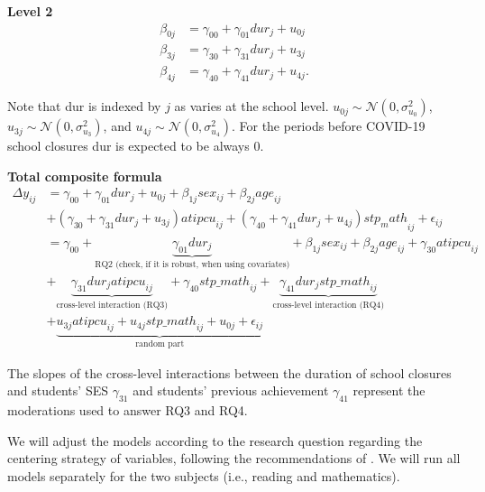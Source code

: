 \noindent\textbf{Level 2}
\begin{equation}\tag{3.2}
    \begin{aligned}
    \beta_{0j} &= \gamma_{00} + \gamma_{01} {dur}_j + u_{0j}\\
    \beta_{3j} &= \gamma_{30} + \gamma_{31} {dur}_j + u_{3j}\\
    \beta_{4j} &= \gamma_{40} + \gamma_{41} {dur}_j + u_{4j}.
    \end{aligned}
\end{equation}

Note that dur is indexed by $j$ as  varies at the school level. $u_{0j} \sim \mathcal{N}(0, \sigma_{u_0}^2)$, $u_{3j} \sim \mathcal{N}(0, \sigma_{u_3}^2)$, and $u_{4j} \sim \mathcal{N}(0, \sigma_{u_4}^2)$. For the periods before COVID-19 school closures dur is expected to be always 0.

\noindent\textbf{Total composite formula}
\begin{equation}\tag{3.3}
	\begin{aligned}
		\Delta y_{ij} &= \gamma_{00} + \gamma_{01} {dur}_j + u_{0j} + \beta_{1j} {sex}_{ij} + \beta_{2j} {age}_{ij}\\
            &+ (\gamma_{30} + \gamma_{31} {dur}_j + u_{3j}) {atipcu}_{ij} + (\gamma_{40} + \gamma_{41} {dur}_j + u_{4j}) {stp_math}_{ij} + \epsilon_{ij}\\
			&= \gamma_{00} + \underbrace{\gamma_{01} {dur}_j}_{\text{RQ2 (check, if it is robust, when using covariates)}} + \beta_{1j} {sex}_{ij} + \beta_{2j} {age}_{ij} + \gamma_{30} {atipcu}_{ij}\\
            &+ \underbrace{\gamma_{31} {dur}_j {atipcu}_{ij}}_{\text{cross-level interaction (RQ3)}} + \gamma_{40} {stp\_math}_{ij} + \underbrace{\gamma_{41} {dur}_j {stp\_math}_{ij}}_{\text{cross-level interaction (RQ4)}}\\
            &+ \underbrace{u_{3j} {atipcu}_{ij} + u_{4j} {stp\_math}_{ij} + u_{0j} + \epsilon_{ij}}_{\text{random part}}
	\end{aligned}
\end{equation}

The slopes of the cross-level interactions between the duration of school closures and students' SES $\gamma_{31}$ and students' previous achievement $\gamma_{41}$ represent the moderations used to answer RQ3 and RQ4.

We will adjust the models according to the research question regarding the centering strategy of variables, following the recommendations of \textcite{enders:2007}. We will run all models separately for the two subjects (i.e., reading and mathematics).

